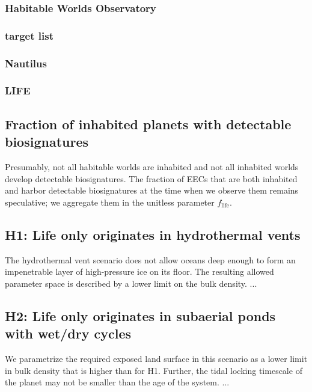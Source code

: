 \documentclass[modern,linenumbers]{aastex631}
\begin{document}
\subsubsection{Habitable Worlds Observatory}
\subsubsection{target list}


\subsubsection{Nautilus}
\subsubsection{LIFE} %



\subsection{Fraction of inhabited planets with detectable biosignatures}
Presumably, not all habitable worlds are inhabited and not all inhabited worlds develop detectable biosignatures.
The fraction of \glspl{EEC} that are both inhabited and harbor detectable biosignatures at the time when we observe them remains speculative; we aggregate them in the unitless parameter $f_\mathrm{life}$.

\subsection{H1: Life only originates in hydrothermal vents}
The hydrothermal vent scenario does not allow oceans deep enough to form an impenetrable layer of high-pressure ice on its floor.
The resulting allowed parameter space is described by a lower limit on the bulk density. 
...

\subsection{H2: Life only originates in subaerial ponds with wet/dry cycles}
We parametrize the required exposed land surface in this scenario as a lower limit in bulk density that is higher than for H1.
Further, the tidal locking timescale of the planet may not be smaller than the age of the system.
...
\end{document}
